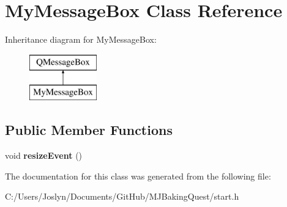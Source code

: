 \hypertarget{class_my_message_box}{\section{My\-Message\-Box Class Reference}
\label{class_my_message_box}
}
Inheritance diagram for My\-Message\-Box\-:\begin{figure}[H]
\begin{center}
\leavevmode
\includegraphics[height=2.000000cm]{class_my_message_box}
\end{center}
\end{figure}
\subsection*{Public Member Functions}
\begin{DoxyCompactItemize}
\item 
\hypertarget{class_my_message_box_a5f2ebba721994e0b991449265daf55fd}{void {\bfseries resize\-Event} ()}\label{class_my_message_box_a5f2ebba721994e0b991449265daf55fd}

\end{DoxyCompactItemize}


The documentation for this class was generated from the following file\-:\begin{DoxyCompactItemize}
\item 
C\-:/\-Users/\-Joslyn/\-Documents/\-Git\-Hub/\-M\-J\-Baking\-Quest/start.\-h\end{DoxyCompactItemize}
